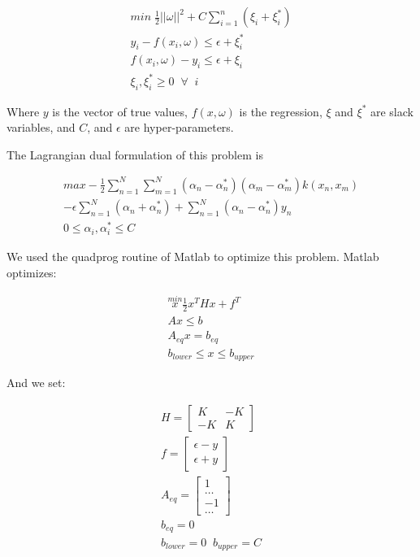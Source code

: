 \documentclass[journal]{IEEEtran}
\begin{document}
\begin{gather}
min\; \frac{1}{2} || \omega ||^2 + C \sum_{i = 1}^{n} (\xi_i + \xi_i^*)\\
\nonumber y_i - f(x_i, \omega) \leq \epsilon + \xi_i^*\\
\nonumber f(x_i, \omega) - y_i \leq \epsilon + \xi_i\\
\nonumber \xi_i, \xi_i^* \geq 0 \; \; \forall \; \; i
\end{gather}

\noindent
Where $y$ is the vector of true values, $f(x, \omega)$ is the regression, $\xi$ and $\xi^*$ are slack variables, and $C$, and $\epsilon$ are hyper-parameters.

The Lagrangian dual formulation of this problem is

\begin{gather}
max -\frac{1}{2} \sum_{n=1}^N \sum_{m=1}^N ( \alpha_n - \alpha_n^*)
      (\alpha_m - \alpha_m^*) k(x_n, x_m)\\
      \nonumber - \epsilon \sum_{n=1}^N(\alpha_n + \alpha_n^*) + \sum_{n=1}^N (\alpha_n - \alpha_n^*) y_n\\
\nonumber 0 \leq \alpha_i , \alpha_i^* \leq C
\end{gather}


We used the quadprog routine of Matlab to optimize this problem. Matlab optimizes:

\begin{gather}
\overset{min}{x} \frac{1}{2}x^T H x + f^T\\
\nonumber A x \leq b\\
\nonumber A_{eq} x = b_{eq}\\
\nonumber b_{lower} \leq x \leq b_{upper}
\end{gather}

\noindent And we set:

\begin{gather}
H = 
\begin{bmatrix}
K & -K\\
-K & K
\end{bmatrix}\\
f =
\begin{bmatrix}
\epsilon - y\\
\epsilon + y
\end{bmatrix}\\
A_{eq} = 
\begin{bmatrix}
1 \\
\dots \\
-1 \\
\dots
\end{bmatrix}\\
b_{eq} = 0\\
b_{lower} = 0 \; \; b_{upper} = C
\end{gather}
\end{document}
